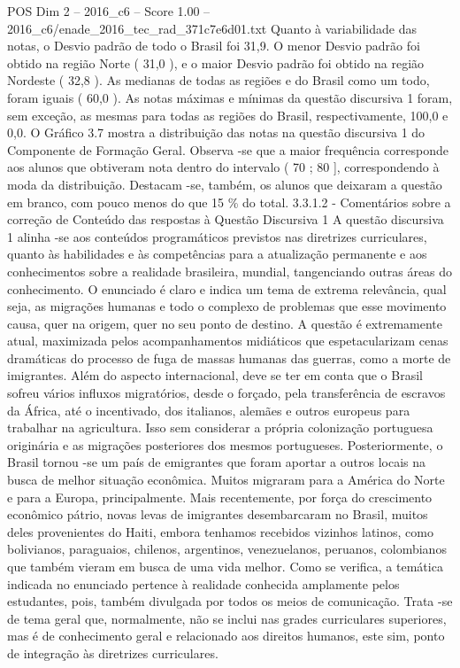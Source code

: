 \begin{textsample}{POS Dim 2 – 2016\_c6 – Score 1.00 – 2016\_c6/enade\_2016\_tec\_rad\_371c7e6d01.txt}
Quanto à variabilidade das notas, o Desvio padrão de todo o Brasil foi 31,9.
O menor Desvio padrão foi obtido na região Norte ( 31,0 ), e o maior Desvio padrão foi obtido na região Nordeste ( 32,8 ).
As medianas de todas as regiões e do Brasil como um todo, foram iguais ( 60,0 ).
As notas máximas e mínimas da questão discursiva 1 foram, sem exceção, as mesmas para todas as regiões do Brasil, respectivamente, 100,0 e 0,0.
O Gráfico 3.7 mostra a distribuição das notas na questão discursiva 1 do Componente de Formação Geral.
Observa -se que a maior frequência corresponde aos alunos que obtiveram nota dentro do intervalo ( 70 ; 80 ], correspondendo à moda da distribuição.
Destacam -se, também, os alunos que deixaram a questão em branco, com pouco menos do que 15 \% do total. 3.3.1.2 - Comentários sobre a correção de Conteúdo das respostas à Questão Discursiva 1 A questão discursiva 1 alinha -se aos conteúdos programáticos previstos nas diretrizes curriculares, quanto às habilidades e às competências para a atualização permanente e aos conhecimentos sobre a realidade brasileira, mundial, tangenciando outras áreas do conhecimento.
O enunciado é claro e indica um tema de extrema relevância, qual seja, as migrações humanas e todo o complexo de problemas que esse movimento causa, quer na origem, quer no seu ponto de destino.
A questão é extremamente atual, maximizada pelos acompanhamentos midiáticos que espetacularizam cenas dramáticas do processo de fuga de massas humanas das guerras, como a morte de imigrantes.
Além do aspecto internacional, deve se ter em conta que o Brasil sofreu vários influxos migratórios, desde o forçado, pela transferência de escravos da África, até o incentivado, dos italianos, alemães e outros europeus para trabalhar na agricultura.
Isso sem considerar a própria colonização portuguesa originária e as migrações posteriores dos mesmos portugueses.
Posteriormente, o Brasil tornou -se um país de emigrantes que foram aportar a outros locais na busca de melhor situação econômica.
Muitos migraram para a América do Norte e para a Europa, principalmente.
Mais recentemente, por força do crescimento econômico pátrio, novas levas de imigrantes desembarcaram no Brasil, muitos deles provenientes do Haiti, embora tenhamos recebidos vizinhos latinos, como bolivianos, paraguaios, chilenos, argentinos, venezuelanos, peruanos, colombianos que também vieram em busca de uma vida melhor.
Como se verifica, a temática indicada no enunciado pertence à realidade conhecida amplamente pelos estudantes, pois, também divulgada por todos os meios de comunicação.
Trata -se de tema geral que, normalmente, não se inclui nas grades curriculares superiores, mas é de conhecimento geral e relacionado aos direitos humanos, este sim, ponto de integração às diretrizes curriculares.

\end{textsample}
